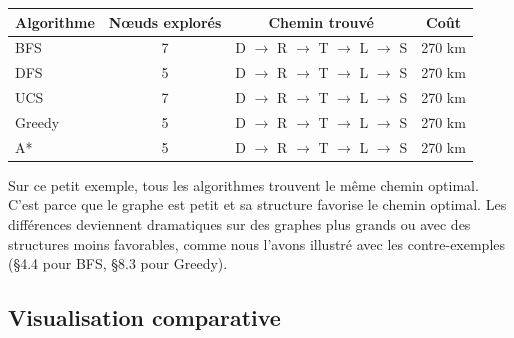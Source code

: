 \documentclass[11pt,a4paper]{article}
\begin{document}
\begin{center}
\begin{tabular}{|l|c|c|c|}
\hline
\textbf{Algorithme} & \textbf{Nœuds explorés} & \textbf{Chemin trouvé} & \textbf{Coût} \\
\hline
BFS & 7 & D $\rightarrow$ R $\rightarrow$ T $\rightarrow$ L $\rightarrow$ S & 270 km \\
DFS & 5 & D $\rightarrow$ R $\rightarrow$ T $\rightarrow$ L $\rightarrow$ S & 270 km \\
UCS & 7 & D $\rightarrow$ R $\rightarrow$ T $\rightarrow$ L $\rightarrow$ S & 270 km \\
Greedy & 5 & D $\rightarrow$ R $\rightarrow$ T $\rightarrow$ L $\rightarrow$ S & 270 km \\
A* & 5 & D $\rightarrow$ R $\rightarrow$ T $\rightarrow$ L $\rightarrow$ S & 270 km \\
\hline
\end{tabular}
\end{center}

Sur ce petit exemple, tous les algorithmes trouvent le même chemin optimal. C'est parce que le graphe est petit et sa structure favorise le chemin optimal. Les différences deviennent dramatiques sur des graphes plus grands ou avec des structures moins favorables, comme nous l'avons illustré avec les contre-exemples (§4.4 pour BFS, §8.3 pour Greedy).

\subsection{Visualisation comparative}
\end{document}
